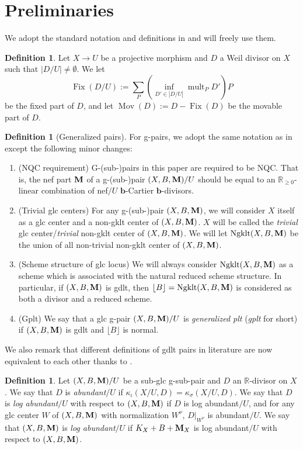 \documentclass[11pt]{amsart}
\numberwithin{equation}{section}
\newcommand{\bb}{\bm{b}}
\newcommand{\Mm}{{\bf{M}}}
\newcommand{\Rr}{\mathbb{R}}
\newcommand{\Fix}{\operatorname{Fix}}
\newcommand{\Mov}{\operatorname{Mov}}
\newcommand{\Ngklt}{\operatorname{Ngklt}}
\newcommand{\mult}{\operatorname{mult}}
\theoremstyle{definition}
\newtheorem{defn}[thm]{Definition}
\theoremstyle{definition}
\theoremstyle{definition}
\begin{document}
\section{Preliminaries}\label{sec: preliminaries}

We adopt the standard notation and definitions in \cite{KM98,BCHM10} and will freely use them. 

\begin{defn}
Let $X\rightarrow U$ be a projective morphism and $D$ a Weil divisor on $X$ such that $|D/U|\not=\emptyset$. We let 
$$\Fix(D/U):=\sum_P(\inf_{D'\in |D/U|}\mult_PD')P$$ be the fixed part of $D$, and let $\Mov(D):=D-\Fix(D)$ be the movable part of $D$.
\end{defn}

\begin{defn}[Generalized pairs]
For g-pairs, we adopt the same notation as in \cite{HL21a} except the following minor changes:
\begin{enumerate}
\item (NQC requirement) G-(sub-)pairs in this paper are required to be NQC. That is, the nef part $\Mm$ of a g-(sub-)pair $(X,B,\Mm)/U$ should be equal to an $\mathbb R_{\geq 0}$-linear combination of nef$/U$ $\bb$-Cartier $\bb$-divisors.
\item (Trivial glc centers) For any g-(sub-)pair $(X,B,\Mm)$, we will consider $X$ itself as a glc center and a non-gklt center of $(X,B,\Mm)$. $X$ will be called the \emph{trivial} glc center/\emph{trivial} non-gklt center of $(X,B,\Mm)$. We will let $\Ngklt(X,B,\Mm)$ be the union of all non-trivial non-gklt center of $(X,B,\Mm)$.
\item (Scheme structure of glc locus) We will always consider $\Ngklt(X,B,\Mm)$ as a scheme which is associated with the natural reduced scheme structure. In particular, if $(X,B,\Mm)$ is gdlt, then $\lfloor B\rfloor=\Ngklt(X,B,\Mm)$ is considered as both a divisor and a reduced scheme.
\item (Gplt) We say that a glc g-pair $(X,B,\Mm)/U$ is \emph{generalized plt} (\emph{gplt} for short) if $(X,B,\Mm)$ is gdlt and $\lfloor B\rfloor$ is normal.
\end{enumerate}
We also remark that different definitions of gdlt pairs in literature are now equivalent to each other thanks to \cite[Theorem 6.1]{Has22}.
\end{defn}

\begin{defn}\label{defn: b log abundance}
Let $(X,B,\Mm)/U$ be a sub-glc g-sub-pair and $D$ an $\Rr$-divisor on $X$. We say that $D$ is \emph{abundant}$/U$ if $\kappa_{\iota}(X/U,D)=\kappa_{\sigma}(X/U,D)$. We say that $D$ is \emph{log abundant}$/U$ with respect to $(X,B,\Mm)$ if $D$ is log abundant$/U$, and for any glc center $W$ of $(X,B,\Mm)$ with normalization $W^{\nu}$, $D|_{W^{\nu}}$ is abundant$/U$. We say that $(X,B,\Mm)$ is \emph{log abundant}$/U$ if $K_X+B+\Mm_X$ is log abundant$/U$ with respect to $(X,B,\Mm)$.
\end{defn}
\end{document}
